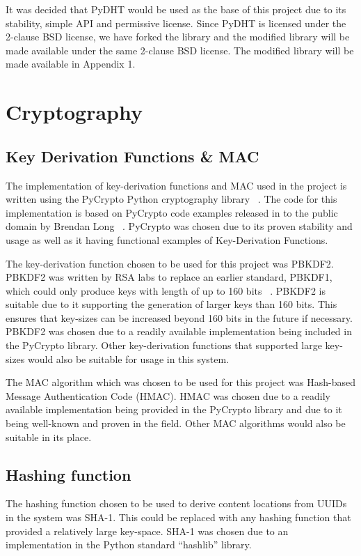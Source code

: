It was decided that PyDHT would be used as the base of this project due to its stability, simple API and permissive license.
Since PyDHT is licensed under the 2-clause BSD license, we have forked the library and the modified library will be made
available under the same 2-clause BSD license. The modified library will be made available in Appendix 1.

\section{Cryptography}

\subsection{Key Derivation Functions \& MAC}

The implementation of key-derivation functions and MAC used in the project is written using the PyCrypto Python cryptography library ~\cite{pycrypto}.
The code for this implementation is based on PyCrypto code examples released in to the public domain by Brendan Long ~\cite{kdfexample}.
PyCrypto was chosen due to its proven stability and usage as well as it having functional examples of Key-Derivation Functions.

The key-derivation function chosen to be used for this project was PBKDF2. PBKDF2 was written by RSA labs to replace an earlier standard,
PBKDF1, which could only produce keys with length of up to 160 bits ~\cite{kdf}. PBKDF2 is suitable due to it supporting the generation of
larger keys than 160 bits. This ensures that key-sizes can be increased beyond 160 bits in the future if necessary.
PBKDF2 was chosen due to a readily available implementation being included in the PyCrypto library.
Other key-derivation functions that supported large key-sizes would also be suitable for usage in this system.

The MAC algorithm which was chosen to be used for this project was Hash-based Message Authentication Code (HMAC). HMAC was chosen due to a readily
available implementation being provided in the PyCrypto library and due to it being well-known and proven in the field.
Other MAC algorithms would also be suitable in its place.

\subsection{Hashing function}

The hashing function chosen to be used to derive content locations from UUIDs in the system was SHA-1. This could be replaced with any hashing function
that provided a relatively large key-space. SHA-1 was chosen due to an implementation in the Python standard ``hashlib'' library.

